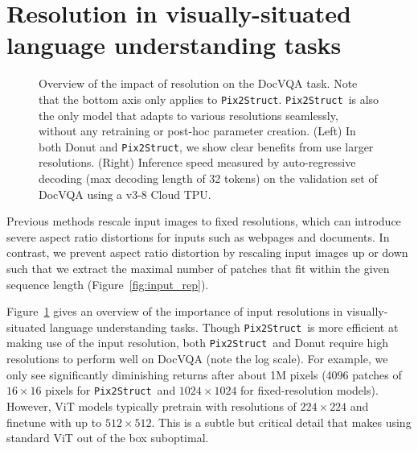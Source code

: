 \documentclass{article} %
\newcommand\ourmodel{{\texttt{Pix2Struct}}}
\begin{document}



\clearpage
\appendix

\section{Resolution in visually-situated language understanding tasks}
\label{sec:resolution}

\begin{figure}[t]

\caption{Overview of the impact of resolution on the DocVQA task. Note that the bottom axis only applies to \ourmodel. \ourmodel~is also the only model that adapts to various resolutions seamlessly, without any retraining or post-hoc parameter creation. (Left) In both Donut and \ourmodel, we show clear benefits from use larger resolutions. (Right) Inference speed measured by auto-regressive decoding (max decoding length of 32 tokens) on the validation set of DocVQA using a v3-8 Cloud TPU.}
\label{fig:resolution}
\end{figure}

Previous methods rescale input images to fixed resolutions, which can introduce severe aspect ratio distortions for inputs such as webpages and documents. In contrast, we prevent aspect ratio distortion by rescaling input images  up or down such that we extract the maximal number of patches that fit within the given sequence length (Figure~\ref{fig:input_rep}).  

Figure~\ref{fig:resolution} gives an overview of the importance of input resolutions in visually-situated language understanding tasks. Though \ourmodel~is more efficient at making use of the input resolution, both \ourmodel~and Donut require high resolutions to perform well on DocVQA (note the log scale). For example, we only see significantly diminishing returns after about 1M pixels (4096 patches of $16\times16$ pixels for \ourmodel~and $1024\times1024$ for fixed-resolution models). However, ViT models typically pretrain with resolutions of $224\times224$ and finetune with up to $512\times512$. This is a subtle but critical detail that makes using standard ViT out of the box suboptimal.
\end{document}
